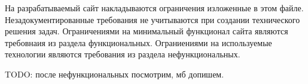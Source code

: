 На разрабатываемый сайт накладываются ограничения изложенные в этом файле.
Незадокументированные требования не учитываются при создании технического решения задач.
Ограничениями на минимальный функционал сайта являются требовнаия из раздела функциональных.
Ограниениями на используемые технологии являются требования из раздела нефункциональных.

TODO: после нефункциональных посмотрим, мб допишем.